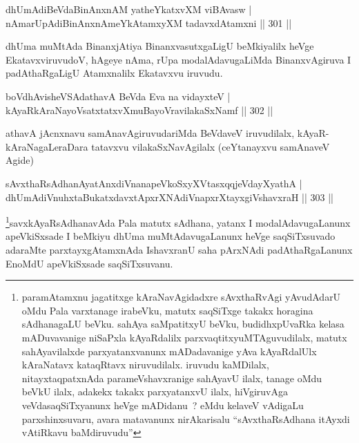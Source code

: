 
\begin{shl}
dhUmAdiBeVdaBinAnxnAM yatheYkatxvXM viBAvasw |
nAmarUpAdiBinAnxnAmeYkAtamxyXM tadavxdAtamxni \hfill || 301 ||
\end{shl}

\begin{artha}
dhUma muMtAda BinanxjAtiya BinanxvasutxgaLigU beMkiyalilx heVge EkatavxviruvudoV, hAgeye nAma, rUpa modalAdavugaLiMda BinanxvAgiruva I padAthaRgaLigU Atamxnalilx Ekatavxvu iruvudu.
\end{artha}


	\begin{shl}
boVdhAvisheVSAdathavA BeVda Eva na vidayxteV |
kAyaRkAraNayoVsatxtatxvXmuBayoVravilakaSxNamf \hfill || 302 ||
\end{shl}

\begin{artha}
athavA jAcnxnavu samAnavAgiruvudariMda BeVdaveV iruvudilalx, kAyaR-kAraNagaLeraDara tatavxvu vilakaSxNavAgilalx (ceYtanayxvu samAnaveV Agide)
\end{artha}

\begin{shl}
sAvxthaRsAdhanAyatAnxdiVnanapeVkoSxyXVtasxqqjeVdayXyathA |
dhUmAdiVnuhxtaBukatxdavxtApxrXNAdiVnapxrXtayxgiVshavxraH \hfill || 303 ||
\end{shl}

\begin{artha}
\footnote{paramAtamxnu jagatitxge kAraNavAgidadxre sAvxthaRvAgi yAvudAdarU oMdu Pala varxtanage irabeVku, matutx saqSiTxge takakx horagina sAdhanagaLU beVku. sahAya saMpatitxyU beVku, budidhxpUvaRka kelasa mADuvavanige niSaPxla kAyaRdalilx parxvaqtitxyuMTAguvudilalx, matutx sahAyavilalxde parxyatanxvanunx mADadavanige yAva kAyaRdalUlx kAraNatavx kataqRtavx niruvudilalx. iruvudu kaMDilalx, nitayxtaqpatxnAda parameVshavxranige sahAyavU ilalx, tanage oMdu beVkU ilalx, adakekx takakx parxyatanxvU ilalx, hiVgiruvAga veVdasaqSiTxyanunx heVge mADidanu~? eMdu kelaveV vAdigaLu parxshinxsuvaru, avara matavanunx nirAkarisalu ``sAvxthaRsAdhana itAyxdi vAtiRkavu baMdiruvudu''}savxkAyaRsAdhanavAda Pala matutx sAdhana, yatanx I modalAdavugaLanunx apeVkiSxsade I beMkiyu dhUma muMtAdavugaLanunx heVge saqSiTxsuvado adaraMte parxtayxgAtamxnAda IshavxranU saha pArxNAdi padAthaRgaLanunx EnoMdU apeVkiSxsade saqSiTxsuvanu.
\end{artha}

